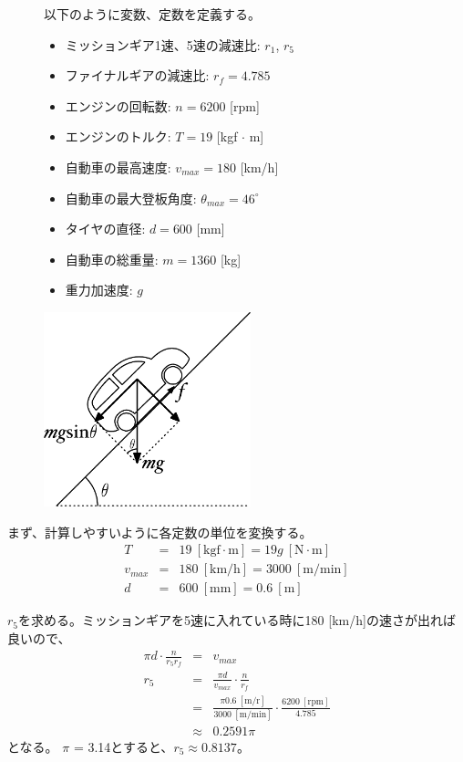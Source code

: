 \documentclass[titlepage]{jsarticle}
\begin{document}
\begin{figure}[h]
  \begin{minipage}{0.495\hsize}
    以下のように変数、定数を定義する。
      \begin{itemize}
        \item ミッションギア1速、5速の減速比: $r_1$, $r_5$
        \item ファイナルギアの減速比: $r_f = 4.785$
        \item エンジンの回転数: $n = 6200$ [rpm]
        \item エンジンのトルク: $T = 19$ [kgf $\cdot$ m]
        \item 自動車の最高速度: $v_{max} = 180$ [km/h]
        \item 自動車の最大登板角度: $\theta_{max} = 46^\circ$
        \item タイヤの直径: $d = 600$ [mm]
        \item 自動車の総重量: $m = 1360$ [kg]
        \item 重力加速度: $g$
      \end{itemize}
  \end{minipage}
  \begin{minipage}{0.495\hsize}
    \includegraphics[width=6cm]{car.pdf}
  \end{minipage}
\end{figure}

まず、計算しやすいように各定数の単位を変換する。
\begin{eqnarray*}
  T &=& 19 \ [\mathrm{kgf \cdot m}] = 19g \ [\mathrm{N \cdot m}] \\
  v_{max} &=& 180 \ [\mathrm{km/h}] = 3000 \ [\mathrm{m/min}] \\
  d &=& 600 \ [\mathrm{mm}] = 0.6 \ [\mathrm m]
\end{eqnarray*}

$r_5$を求める。ミッションギアを5速に入れている時に180 [km/h]の速さが出れば良いので、
\begin{eqnarray*}
  \pi d \cdot \frac{n}{r_5r_f} &=& v_{max} \\
  r_5 &=& \frac{\pi d}{v_{max}} \cdot \frac{n}{r_f} \\
  &=& \frac{\pi 0.6 \ [\mathrm{m/r}]}{3000 \ [\mathrm{m/min}]} \cdot \frac{6200 \ [\mathrm{rpm}]}{4.785} \\
  &\approx& 0.2591 \pi
\end{eqnarray*}
となる。
$\pi$ = 3.14とすると、$r_5 \approx 0.8137$。
\end{document}
